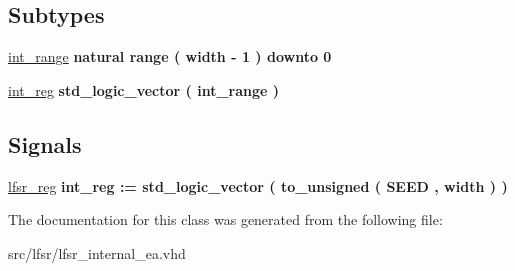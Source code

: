 \subsection*{Subtypes}
 \begin{DoxyCompactItemize}
\item 
\hypertarget{classlfsr__internal_1_1galois_ab2d0d8d261d904b93bba56b13edd625e}{\hyperlink{classlfsr__internal_1_1galois_ab2d0d8d261d904b93bba56b13edd625e}{int\-\_\-range} {\bfseries \textcolor{comment}{natural}\textcolor{vhdlchar}{ }\textcolor{vhdlkeyword}{range}\textcolor{vhdlchar}{ }\textcolor{vhdlchar}{(}\textcolor{vhdlchar}{ }\textcolor{vhdlchar}{width}\textcolor{vhdlchar}{ }\textcolor{vhdlchar}{-\/}\textcolor{vhdlchar}{ } \textcolor{vhdldigit}{1} \textcolor{vhdlchar}{ }\textcolor{vhdlchar}{)}\textcolor{vhdlchar}{ }\textcolor{vhdlchar}{ }\textcolor{vhdlchar}{ }\textcolor{vhdlchar}{ }\textcolor{vhdlkeyword}{downto}\textcolor{vhdlchar}{ }\textcolor{vhdlchar}{ }\textcolor{vhdlchar}{ } \textcolor{vhdldigit}{0} \textcolor{vhdlchar}{ }} }\label{classlfsr__internal_1_1galois_ab2d0d8d261d904b93bba56b13edd625e}

\item 
\hypertarget{classlfsr__internal_1_1galois_a2d7c50054760503d0dd91b9baaa48217}{\hyperlink{classlfsr__internal_1_1galois_a2d7c50054760503d0dd91b9baaa48217}{int\-\_\-reg} {\bfseries \textcolor{comment}{std\-\_\-logic\-\_\-vector}\textcolor{vhdlchar}{ }\textcolor{vhdlchar}{(}\textcolor{vhdlchar}{ }\textcolor{vhdlchar}{ }\textcolor{vhdlchar}{int\-\_\-range}\textcolor{vhdlchar}{ }\textcolor{vhdlchar}{)}\textcolor{vhdlchar}{ }} }\label{classlfsr__internal_1_1galois_a2d7c50054760503d0dd91b9baaa48217}

\end{DoxyCompactItemize}
\subsection*{Signals}
 \begin{DoxyCompactItemize}
\item 
\hypertarget{classlfsr__internal_1_1galois_a42727b75ccbd70a3d1f5b053dc4f77de}{\hyperlink{classlfsr__internal_1_1galois_a42727b75ccbd70a3d1f5b053dc4f77de}{lfsr\-\_\-reg} {\bfseries \textcolor{vhdlchar}{int\-\_\-reg}\textcolor{vhdlchar}{ }\textcolor{vhdlchar}{ }\textcolor{vhdlchar}{\-:}\textcolor{vhdlchar}{=}\textcolor{vhdlchar}{ }\textcolor{comment}{std\-\_\-logic\-\_\-vector}\textcolor{vhdlchar}{ }\textcolor{vhdlchar}{(}\textcolor{vhdlchar}{ }\textcolor{vhdlchar}{ }\textcolor{vhdlchar}{to\-\_\-unsigned}\textcolor{vhdlchar}{ }\textcolor{vhdlchar}{(}\textcolor{vhdlchar}{ }\textcolor{vhdlchar}{ }\textcolor{vhdlchar}{S\-E\-E\-D}\textcolor{vhdlchar}{ }\textcolor{vhdlchar}{,}\textcolor{vhdlchar}{ }\textcolor{vhdlchar}{ }\textcolor{vhdlchar}{width}\textcolor{vhdlchar}{ }\textcolor{vhdlchar}{)}\textcolor{vhdlchar}{ }\textcolor{vhdlchar}{ }\textcolor{vhdlchar}{)}\textcolor{vhdlchar}{ }} }\label{classlfsr__internal_1_1galois_a42727b75ccbd70a3d1f5b053dc4f77de}

\end{DoxyCompactItemize}


The documentation for this class was generated from the following file\-:\begin{DoxyCompactItemize}
\item 
src/lfsr/lfsr\-\_\-internal\-\_\-ea.\-vhd\end{DoxyCompactItemize}
